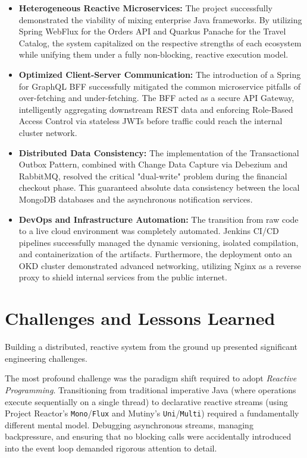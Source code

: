 \begin{itemize}
    \item \textbf{Heterogeneous Reactive Microservices:} The project successfully demonstrated the viability of mixing enterprise Java frameworks. By utilizing Spring WebFlux for the Orders API and Quarkus Panache for the Travel Catalog, the system capitalized on the respective strengths of each ecosystem while unifying them under a fully non-blocking, reactive execution model.
    \item \textbf{Optimized Client-Server Communication:} The introduction of a Spring for GraphQL BFF successfully mitigated the common microservice pitfalls of over-fetching and under-fetching. The BFF acted as a secure API Gateway, intelligently aggregating downstream REST data and enforcing Role-Based Access Control via stateless JWTs before traffic could reach the internal cluster network.
    \item \textbf{Distributed Data Consistency:} The implementation of the Transactional Outbox Pattern, combined with Change Data Capture via Debezium and RabbitMQ, resolved the critical "dual-write" problem during the financial checkout phase. This guaranteed absolute data consistency between the local MongoDB databases and the asynchronous notification services.
    \item \textbf{DevOps and Infrastructure Automation:} The transition from raw code to a live cloud environment was completely automated. Jenkins CI/CD pipelines successfully managed the dynamic versioning, isolated compilation, and containerization of the artifacts. Furthermore, the deployment onto an OKD cluster demonstrated advanced networking, utilizing Nginx as a reverse proxy to shield internal services from the public internet.
\end{itemize}

\section{Challenges and Lessons Learned}

Building a distributed, reactive system from the ground up presented significant engineering challenges. 

The most profound challenge was the paradigm shift required to adopt \textit{Reactive Programming}. Transitioning from traditional imperative Java (where operations execute sequentially on a single thread) to declarative reactive streams (using Project Reactor's \texttt{Mono}/\texttt{Flux} and Mutiny's \texttt{Uni}/\texttt{Multi}) required a fundamentally different mental model. Debugging asynchronous streams, managing backpressure, and ensuring that no blocking calls were accidentally introduced into the event loop demanded rigorous attention to detail.

